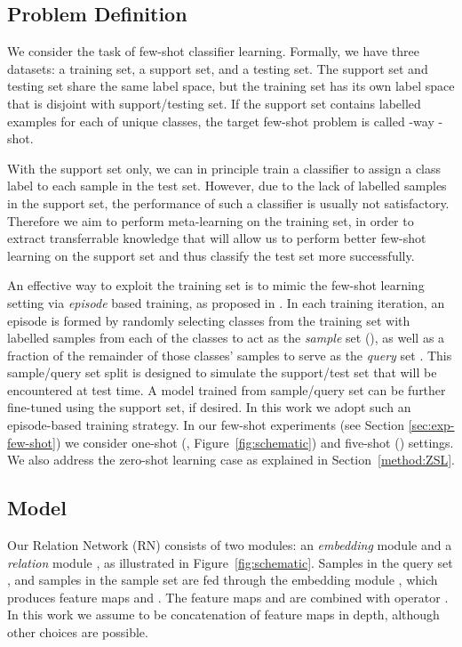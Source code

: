 \documentclass[10pt,twocolumn,letterpaper]{article}
\begin{document}
\subsection{Problem Definition}
We consider the task of few-shot classifier learning. Formally, we have three datasets: a training set, a support set, and a testing set. The  support set and testing set share the same label space, but the training set has its own label space that is disjoint with support/testing set. If the support set contains  labelled examples for each of  unique classes, the target few-shot problem is called -way -shot. 

With the support set only, we can in principle train a classifier to assign a class label  to each sample  in the test set. However, due to the lack of labelled samples in the support set, the performance of such a classifier is usually not satisfactory. Therefore we aim to perform meta-learning on the training set, in order to extract transferrable knowledge that will allow us to perform better few-shot learning on the support set and thus classify the test set more successfully.

An effective way to exploit the training set is to mimic the few-shot learning setting via {\em episode} based training, as proposed in \cite{vinyals2016matching}. In each training iteration, an episode is formed by randomly selecting  classes from the training set with  labelled samples from each of the  classes to act as the \emph{sample} set  (), as well as a fraction 
of the remainder of those  classes' samples to serve as the \emph{query} set . This sample/query set split is designed to simulate the support/test set that will be encountered at test time. A model trained from sample/query set can be further fine-tuned using the support set, if desired. In this work we adopt such an episode-based training strategy. In our few-shot experiments (see Section \ref{sec:exp-few-shot}) we consider one-shot (, Figure~\ref{fig:schematic}) and five-shot () settings. We also address the  zero-shot learning case as explained in Section~\ref{method:ZSL}.




\subsection{Model}
Our Relation Network (RN) consists of two modules: an {\em embedding} module  and a {\em relation} module , as illustrated in Figure~\ref{fig:schematic}. Samples  in the query set , and samples  in the sample set  are fed through the embedding module , which produces feature maps   and . The feature maps  and  are combined with operator . In this work we assume  to be concatenation of feature maps in depth, although other choices are possible.
\end{document}
